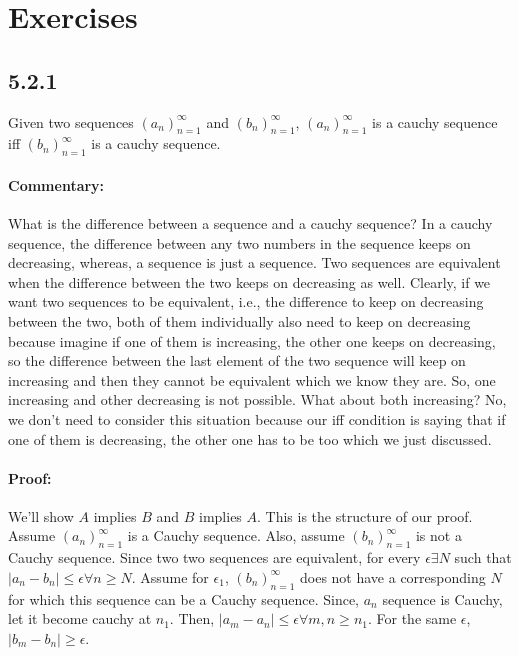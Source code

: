 \documentclass{report}
\begin{document}
\section*{Exercises}
\subsection*{5.2.1}
Given two sequences $\left( a_n \right)_{n=1}^\infty$ and $\left( b_n \right)_{n=1}^\infty$,  $\left( a_n \right)_{n=1}^\infty$ is a cauchy sequence iff  $\left( b_n \right)_{n=1}^\infty$ is a cauchy sequence.

\paragraph{Commentary: } What is the difference between a sequence and a  cauchy sequence? In a cauchy sequence, the difference between any two numbers in the sequence keeps on decreasing, whereas, a sequence is just a sequence. Two sequences are equivalent when the difference between the two keeps on decreasing as well. Clearly, if we want two sequences to be equivalent, i.e., the difference to keep on decreasing between the two, both of them individually also need to keep on decreasing because imagine if one of them is increasing, the other one keeps on decreasing, so the difference between the last element of the two sequence will keep on increasing and then they cannot be equivalent which we know they are. So, one increasing and other decreasing is not possible. What about both increasing? No, we don't need to consider this situation because our iff condition is saying that if one of them is decreasing, the other one has to be too which we just discussed. 

\paragraph{Proof: }
We'll show $A$ implies $B$ and $B$ implies $A$. This is the structure of our proof. Assume  $\left( a_n \right)_{n=1}^\infty$ is a Cauchy sequence. Also, assume  $\left( b_n \right)_{n=1}^\infty$ is not a Cauchy sequence. Since two two sequences are equivalent, for every $\epsilon \exists N$ such that $|a_n - b_n| \le \epsilon \forall n \ge N$. Assume for $\epsilon_1$,  $\left( b_n \right)_{n=1}^\infty$ does not have a corresponding  $N$ for which this sequence can be a Cauchy sequence. Since, $a_n$ sequence is Cauchy, let it become cauchy at $n_1$. Then, $|a_m - a_n| \le \epsilon \forall m,n \ge n_1$. For the same $\epsilon$,  $|b_m - b_n| \ge \epsilon$.
\end{document}
